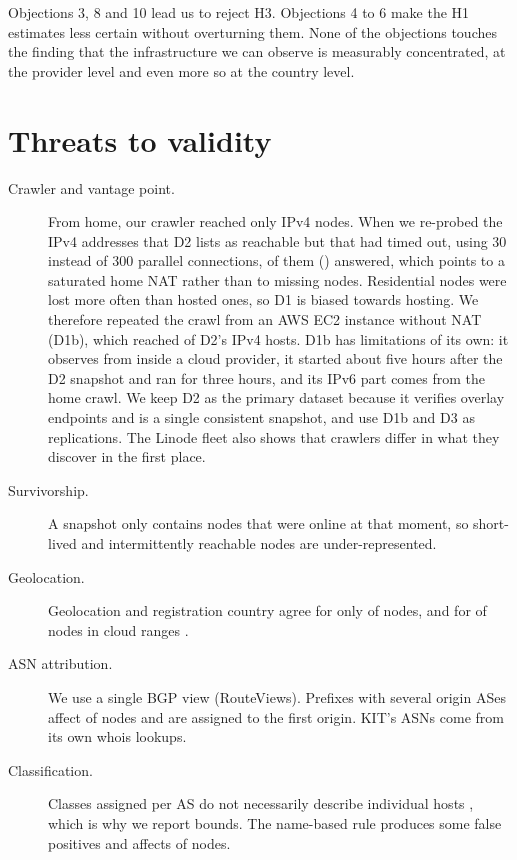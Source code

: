 \documentclass[10pt,a4paper]{article}
\begin{document}
\noindent Objections 3, 8 and 10 lead us to reject H3. Objections 4 to 6 make the H1 estimates less certain without overturning them. None of the objections touches the finding that the infrastructure we can observe is measurably concentrated, at the provider level and even more so at the country level.

\section{Threats to validity}\label{sec:threats}

\begin{description}
\item[Crawler and vantage point.] From home, our crawler reached only \DoneIPvfour{} IPv4 nodes. When we re-probed the \ReprobeTargets{} IPv4 addresses that D2 lists as reachable but that had timed out, using 30 instead of 300 parallel connections, \ReprobeOK{} of them (\ReprobeShare) answered, which points to a saturated home NAT rather than to missing nodes. Residential nodes were lost more often than hosted ones, so D1 is biased towards hosting. We therefore repeated the crawl from an AWS EC2 instance without NAT (D1b), which reached \AwsCoverDtwoVfour{} of D2's IPv4 hosts. D1b has limitations of its own: it observes from inside a cloud provider, it started about five hours after the D2 snapshot and ran for three hours, and its IPv6 part comes from the home crawl. We keep D2 as the primary dataset because it verifies overlay endpoints and is a single consistent snapshot, and use D1b and D3 as replications. The Linode fleet also shows that crawlers differ in what they discover in the first place.
\item[Survivorship.] A snapshot only contains nodes that were online at that moment, so short-lived and intermittently reachable nodes are under-represented.
\item[Geolocation.] Geolocation and registration country agree for only \GeoAgree{} of nodes, and for \GeoAgreeHone{} of nodes in cloud ranges \cite{poese2011geoloc}.
\item[ASN attribution.] We use a single BGP view (RouteViews). Prefixes with several origin ASes affect \MoasShare{} of nodes and are assigned to the first origin. KIT's ASNs come from its own whois lookups.
\item[Classification.] Classes assigned per AS do not necessarily describe individual hosts \cite{ziv2021asdb}, which is why we report bounds. The name-based rule produces some false positives and affects \RegexShare{} of nodes.

\end{description}
\end{document}
